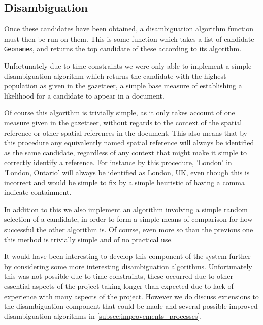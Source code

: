 \documentclass[12pt, a4paper]{report}
\begin{document}

\subsection{Disambiguation}
\label{subsec:disambiguation}

Once these candidates have been obtained, a disambiguation algorithm function must then be run on them. This is some function which takes a list of candidate \verb#Geoname#s, and returns the top candidate of these according to its algorithm.

Unfortunately due to time constraints we were only able to implement a simple disambiguation algorithm which returns the candidate with the highest population as given in the gazetteer, a simple base measure of establishing a likelihood for a candidate to appear in a document.

Of course this algorithm is trivially simple, as it only takes account of one measure given in the gazetteer, without regards to the context of the spatial reference or other spatial references in the document. This also means that by this procedure any equivalently named spatial reference will always be identified as the same candidate, regardless of any context that might make it simple to correctly identify a reference. For instance by this procedure, 'London' in 'London, Ontario' will always be identified as London, UK, even though this is incorrect and would be simple to fix by a simple heuristic of having a comma indicate containment.

In addition to this we also implement an algorithm involving a simple random selection of a candidate, in order to form a simple means of comparison for how successful the other algorithm is. Of course, even more so than the previous one this method is trivially simple and of no practical use.

It would have been interesting to develop this component of the system further by considering some more interesting disambiguation algorithms. Unfortunately this was not possible due to time constraints, these occurred due to other essential aspects of the project taking longer than expected due to lack of experience with many aspects of the project. However we do discuss extensions to the disambiguation component that could be made and several possible improved disambiguation algorithms in \ref{subsec:improvements_processes}.
\end{document}
